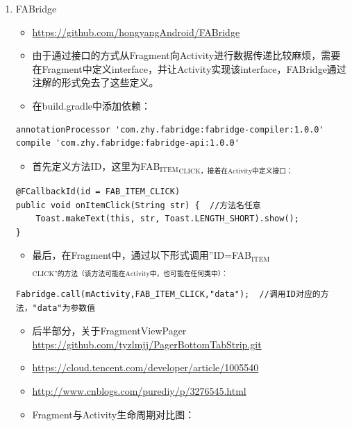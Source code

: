 \documentclass[9pt, b5paaper]{book}
\begin{document}
\begin{enumerate}
\item FABridge
\label{sec-3-4-1-1}
\begin{itemize}
\item \url{https://github.com/hongyangAndroid/FABridge}
\item 由于通过接口的方式从Fragment向Activity进行数据传递比较麻烦，需要在Fragment中定义interface，并让Activity实现该interface，FABridge通过注解的形式免去了这些定义。
\item 在build.gradle中添加依赖：
\end{itemize}
\begin{verbatim}
annotationProcessor 'com.zhy.fabridge:fabridge-compiler:1.0.0'
compile 'com.zhy.fabridge:fabridge-api:1.0.0'
\end{verbatim}
\begin{itemize}
\item 首先定义方法ID，这里为FAB$_{\text{ITEM}}$$_{\text{CLICK，接着在Activity中定义接口：}}$
\end{itemize}
\begin{verbatim}
@FCallbackId(id = FAB_ITEM_CLICK)
public void onItemClick(String str) {  //方法名任意
    Toast.makeText(this, str, Toast.LENGTH_SHORT).show();
}
\end{verbatim}
\begin{itemize}
\item 最后，在Fragment中，通过以下形式调用”ID=FAB$_{\text{ITEM}}$$_{\text{CLICK”的方法（该方法可能在Activity中，也可能在任何类中）：}}$
\end{itemize}
\begin{verbatim}
Fabridge.call(mActivity,FAB_ITEM_CLICK,"data");  //调用ID对应的方法，"data"为参数值
\end{verbatim}
\begin{itemize}
\item 后半部分，关于FragmentViewPager \url{https://github.com/tyzlmjj/PagerBottomTabStrip.git}
\item \url{https://cloud.tencent.com/developer/article/1005540}

\item \url{http://www.cnblogs.com/purediy/p/3276545.html}
\item Fragment与Activity生命周期对比图：
\end{itemize}
\end{enumerate}
\end{document}
